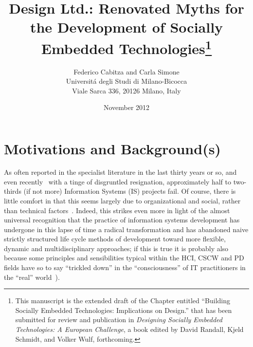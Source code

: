 \documentclass{article}
\title{Design Ltd.: Renovated Myths for the Development of Socially Embedded Technologies\footnote{This manuscript is the extended draft of the Chapter entitled ``Building Socially Embedded Technologies: Implications on Design.'' that has been submitted for review and publication in \emph{Designing Socially Embedded Technologies: A European Challenge}, a book edited by David Randall, Kjeld Schmidt, and Volker Wulf, forthcoming.
}}
\author{Federico Cabitza and Carla Simone\\Universit\'{a} degli Studi di Milano-Bicocca\\Viale Sarca 336, 20126 Milano, Italy}
\date{November 2012}
\begin{document}
\maketitle

\section{Motivations and Background(s)}

\label{sec:intro}
As often reported in the specialist literature in the last thirty years or so, and even recently~\citep[e.g., ][]{lyytinen_learning_1999,shapiro_participatory_2005,pan_information_2008,warkentin_analysis_2009} with a tinge of disgruntled resignation, approximately half to two-thirds (if not more) Information Systems (IS) projects fail. Of course, there is little comfort in that this seems largely due to organizational and social, rather than technical factors~\citep{pan_information_2008,kaplan_health_2009}. Indeed, this strikes even more in light of the almost universal recognition that the practice of information systems development has undergone in this lapse of time a radical transformation and has abandoned naive strictly structured life cycle methods of development toward more flexible, dynamic and multidisciplinary approaches; if this is true it is probably also because some principles and sensibilities typical within the HCI, CSCW and PD fields have so to say ``trickled down'' in the ``consciousness'' of IT practitioners in the ``real'' world~\citep[cf. e.g.,~][]{shapiro_participatory_2005,fitzpatrick_review_2012}).
\end{document}
